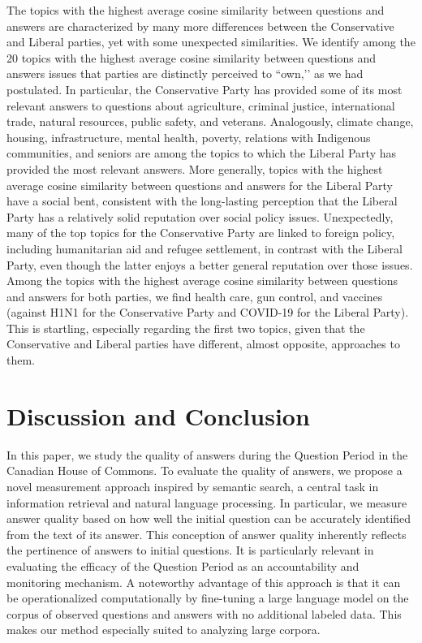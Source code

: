 {{The topics with the highest average cosine similarity between questions and answers are characterized by many more differences between the Conservative and Liberal parties, yet with some unexpected similarities. We identify among the 20 topics with the highest average cosine similarity between questions and answers issues that parties are distinctly perceived to ``own,’’ as we had postulated. In particular, the Conservative Party has provided some of its most relevant answers to questions about agriculture, criminal justice, international trade, natural resources, public safety, and veterans. Analogously, climate change, housing, infrastructure, mental health, poverty, relations with Indigenous communities, and seniors are among the topics to which the Liberal Party has provided the most relevant answers. More generally, topics with the highest average cosine similarity between questions and answers for the Liberal Party have a social bent, consistent with the long-lasting perception that the Liberal Party has a relatively solid reputation over social policy issues. Unexpectedly, many of the top topics for the Conservative Party are linked to foreign policy, including humanitarian aid and refugee settlement, in contrast with the Liberal Party, even though the latter enjoys a better general reputation over those issues. Among the topics with the highest average cosine similarity between questions and answers for both parties, we find health care, gun control, and vaccines (against H1N1 for the Conservative Party and COVID-19 for the Liberal Party). This is startling, especially regarding the first two topics, given that the Conservative and Liberal parties have different, almost opposite, approaches to them.

\section*{Discussion and Conclusion}

In this paper, we study the quality of answers during the Question Period in the Canadian House of Commons. To evaluate the quality of answers, we propose a novel measurement approach inspired by semantic search, a central task in information retrieval and natural language processing. In particular, we measure answer quality based on how well the initial question can be accurately identified from the text of its answer. This conception of answer quality inherently reflects the pertinence of answers to initial questions. It is particularly relevant in evaluating the efficacy of the Question Period as an accountability and monitoring mechanism. A noteworthy advantage of this approach is that it can be operationalized computationally by fine-tuning a large language model on the corpus of observed questions and answers with no additional labeled data. This makes our method especially suited to analyzing large corpora.

}}
